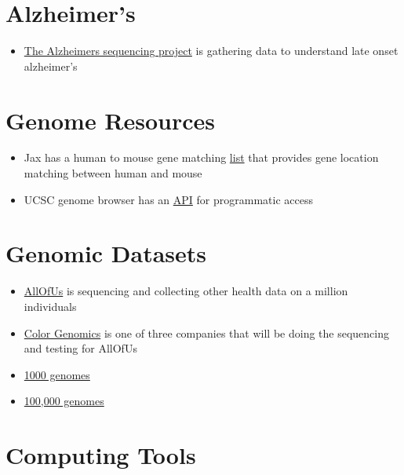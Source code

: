 \documentclass[]{book}
\providecommand{\tightlist}{%
  \setlength{\itemsep}{0pt}\setlength{\parskip}{0pt}}
\begin{document}
\section{Alzheimer's}\label{alzheimers}

\begin{itemize}
\tightlist
\item
  \href{https://www.niagads.org/adsp/content/home}{The Alzheimers
  sequencing project} is gathering data to understand late onset
  alzheimer's
\end{itemize}

\section{Genome Resources}\label{genome-resources}

\begin{itemize}
\tightlist
\item
  Jax has a human to mouse gene matching
  \href{http://www.informatics.jax.org/downloads/reports/HOM_MouseHumanSequence.rpt}{list}
  that provides gene location matching between human and mouse
\item
  UCSC genome browser has an
  \href{http://genomewiki.ucsc.edu/index.php/Programmatic_access_to_the_Genome_Browser}{API}
  for programmatic access
\end{itemize}

\section{Genomic Datasets}\label{genomic-datasets}

\begin{itemize}
\tightlist
\item
  \href{ttps://www.joinallofus.org/en/how-to-join}{AllOfUs} is
  sequencing and collecting other health data on a million individuals
\item
  \href{https://www.color.com/}{Color Genomics} is one of three
  companies that will be doing the sequencing and testing for AllOfUs
\item
  \href{http://www.internationalgenome.org/data/}{1000 genomes}
\item
  \href{https://www.genomicsengland.co.uk/}{100,000 genomes}
\end{itemize}

\section{Computing Tools}\label{computing-tools}
\end{document}
